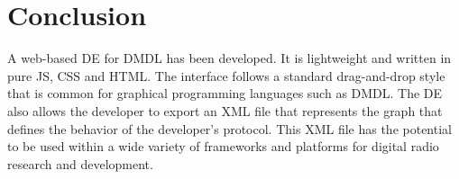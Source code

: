 \documentclass[journal,comsoc]{IEEEtran}
\begin{document}
\section{Conclusion}
A web-based DE for DMDL has been developed. It is lightweight and written in pure JS, CSS and HTML.
The interface follows a standard drag-and-drop style that is common for graphical programming
languages such as DMDL. The DE also allows the developer to export an XML file that represents the
graph that defines the behavior of the developer's protocol. This XML file has the potential to
be used within a wide variety of frameworks and platforms for digital radio research and
development.
 

%
%



%
%
\end{document}
